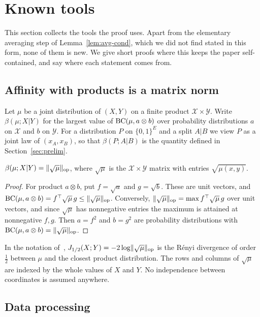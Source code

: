 \section{Known tools}\label{sec:tools}

This section collects the tools the proof uses. Apart from the elementary averaging step of Lemma~\ref{lem:avg-cond}, which we did not find stated in this form, none of them is new. We give short proofs where this keeps the paper self-contained, and say where each statement comes from.

\subsection{Affinity with products is a matrix norm}

Let $\mu$ be a joint distribution of $(X,Y)$ on a finite product $\mathcal X\times\mathcal Y$. Write $\beta(\mu;X|Y)$ for the largest value of $\mathrm{BC}(\mu,a\otimes b)$ over probability distributions $a$ on $\mathcal X$ and $b$ on $\mathcal Y$. For a distribution $P$ on $\{0,1\}^E$ and a split $A|B$ we view $P$ as a joint law of $(x_A,x_B)$, so that $\beta(P;A|B)$ is the quantity defined in Section~\ref{sec:prelim}.

\begin{lemma}\label{lem:LP}
$\beta(\mu;X|Y)=\lVert \sqrt\mu\rVert_{\mathrm{op}}$, where $\sqrt\mu$ is the $\mathcal X\times\mathcal Y$ matrix with entries $\sqrt{\mu(x,y)}$.
\end{lemma}

\begin{proof}
For product $a\otimes b$, put $f=\sqrt a$ and $g=\sqrt b$. These are unit vectors, and $\mathrm{BC}(\mu,a\otimes b)=f^{\top}\sqrt\mu\,g\le\lVert \sqrt\mu\rVert_{\mathrm{op}}$. Conversely, $\lVert \sqrt\mu\rVert_{\mathrm{op}}=\max f^{\top}\sqrt\mu\,g$ over unit vectors, and since $\sqrt\mu$ has nonnegative entries the maximum is attained at nonnegative $f,g$. Then $a=f^2$ and $b=g^2$ are probability distributions with $\mathrm{BC}(\mu,a\otimes b)=\lVert \sqrt\mu\rVert_{\mathrm{op}}$.
\end{proof}

In the notation of~\cite{LapidothPfister19}, $J_{1/2}(X;Y)=-2\log\lVert \sqrt\mu\rVert_{\mathrm{op}}$ is the R\'enyi divergence of order $\frac12$ between $\mu$ and the closest product distribution. The rows and columns of $\sqrt\mu$ are indexed by the whole values of $X$ and $Y$. No independence between coordinates is assumed anywhere.

\subsection{Data processing}

